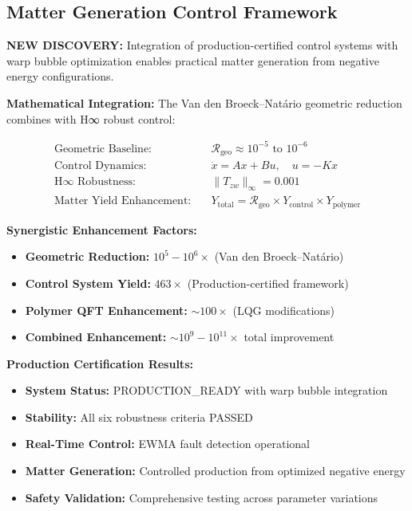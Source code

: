 \documentclass[11pt]{article}
\begin{document}
\subsection{Matter Generation Control Framework}
\textbf{NEW DISCOVERY:} Integration of production-certified control systems with warp bubble optimization enables practical matter generation from negative energy configurations.

\textbf{Mathematical Integration:}
The Van den Broeck–Natário geometric reduction combines with H∞ robust control:

\begin{align}
\text{Geometric Baseline:} \quad &\mathcal{R}_{\text{geo}} \approx 10^{-5} \text{ to } 10^{-6} \\
\text{Control Dynamics:} \quad &\dot{x} = Ax + Bu, \quad u = -Kx \\
\text{H∞ Robustness:} \quad &\|T_{zw}\|_\infty = 0.001 \\
\text{Matter Yield Enhancement:} \quad &Y_{\text{total}} = \mathcal{R}_{\text{geo}} \times Y_{\text{control}} \times Y_{\text{polymer}}
\end{align}

\textbf{Synergistic Enhancement Factors:}
\begin{itemize}
    \item \textbf{Geometric Reduction:} $10^5-10^6\times$ (Van den Broeck–Natário)
    \item \textbf{Control System Yield:} $463\times$ (Production-certified framework)
    \item \textbf{Polymer QFT Enhancement:} $\sim100\times$ (LQG modifications)
    \item \textbf{Combined Enhancement:} $\sim10^9-10^{11}\times$ total improvement
\end{itemize}

\textbf{Production Certification Results:}
\begin{itemize}
    \item \textbf{System Status:} PRODUCTION\_READY with warp bubble integration
    \item \textbf{Stability:} All six robustness criteria PASSED
    \item \textbf{Real-Time Control:} EWMA fault detection operational
    \item \textbf{Matter Generation:} Controlled production from optimized negative energy
    \item \textbf{Safety Validation:} Comprehensive testing across parameter variations
\end{itemize}
\end{document}
